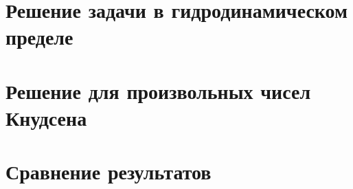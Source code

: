 \documentclass[english,russian,a4paper,12pt]{article}
\begin{document}
\section{Решение задачи в гидродинамическом пределе}

\section{Решение для произвольных чисел Кнудсена}

\section{Сравнение результатов}
\end{document}
